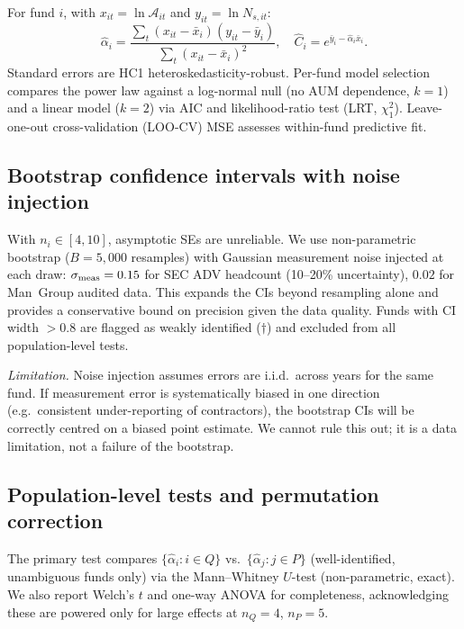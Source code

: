 \documentclass[10pt,onecolumn]{article}
\newcommand{\Ac}{\mathcal{A}}
\newcommand{\alphahat}{\hat{\alpha}}
\newcommand{\Chat}{\hat{C}}
\begin{document}
For fund $i$, with $x_{it} = \ln\Ac_{it}$ and
$y_{it} = \ln N_{s,it}$:
\begin{equation}
  \alphahat_i
    = \frac{\sum_t (x_{it}-\bar x_i)(y_{it}-\bar y_i)}
           {\sum_t (x_{it}-\bar x_i)^2},\quad
  \Chat_i = e^{\bar y_i - \alphahat_i \bar x_i}.
  \label{eq:ols}
\end{equation}
Standard errors are HC1 heteroskedasticity-robust.
Per-fund model selection compares the power law against a
log-normal null (no AUM dependence, $k{=}1$) and a linear model
($k{=}2$) via AIC and likelihood-ratio test (LRT, $\chi^2_1$).
Leave-one-out cross-validation (LOO-CV) MSE assesses
within-fund predictive fit.

\subsection{Bootstrap confidence intervals with noise injection}
\label{sec:bootstrap}

With $n_i \in [4,10]$, asymptotic SEs are unreliable.
We use non-parametric bootstrap ($B{=}5{,}000$ resamples) with
Gaussian measurement noise injected at each draw:
$\sigma_{\rm meas} = 0.15$ for SEC ADV headcount (10--20\%
uncertainty), $0.02$ for Man~Group audited data.
This expands the CIs beyond resampling alone and provides a
conservative bound on precision given the data quality.
Funds with CI width $> 0.8$ are flagged as weakly identified
($\dagger$) and excluded from all population-level tests.

\noindent\textit{Limitation.}
Noise injection assumes errors are i.i.d.\ across years for
the same fund.
If measurement error is systematically biased in one direction
(e.g.\ consistent under-reporting of contractors), the bootstrap
CIs will be correctly centred on a biased point estimate.
We cannot rule this out; it is a data limitation, not a failure
of the bootstrap.

\subsection{Population-level tests and permutation correction}
\label{sec:tests}

The primary test compares $\{\alphahat_i : i \in Q\}$ vs.\
$\{\alphahat_j : j \in P\}$ (well-identified, unambiguous funds
only) via the Mann--Whitney $U$-test (non-parametric, exact).
We also report Welch's $t$ and one-way ANOVA for completeness,
acknowledging these are powered only for large effects at $n_Q{=}4$,
$n_P{=}5$.
\end{document}
